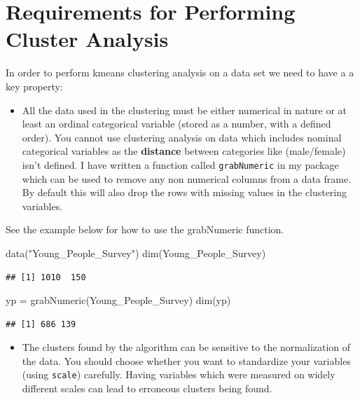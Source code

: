 \documentclass[
]{book}
\newenvironment{Shaded}{\begin{snugshade}}{\end{snugshade}}
\newcommand{\FunctionTok}[1]{\textcolor[rgb]{0.00,0.00,0.00}{#1}}
\newcommand{\NormalTok}[1]{#1}
\newcommand{\OtherTok}[1]{\textcolor[rgb]{0.56,0.35,0.01}{#1}}
\newcommand{\StringTok}[1]{\textcolor[rgb]{0.31,0.60,0.02}{#1}}
\providecommand{\tightlist}{%
  \setlength{\itemsep}{0pt}\setlength{\parskip}{0pt}}
\theoremstyle{definition}
\theoremstyle{definition}
\theoremstyle{definition}
\theoremstyle{definition}
\theoremstyle{remark}
\begin{document}
\hypertarget{requirements-for-performing-cluster-analysis}{%
\section{Requirements for Performing Cluster Analysis}\label{requirements-for-performing-cluster-analysis}}

In order to perform kmeans clustering analysis on a data set we need to have a a key property:

\begin{itemize}
\tightlist
\item
  All the data used in the clustering must be either numerical in nature or at least an ordinal categorical variable (stored as a number, with a defined order). You cannot use clustering analysis on data which includes nominal categorical variables as the \textbf{distance} between categories like (male/female) isn't defined. I have written a function called \texttt{grabNumeric} in my package which can be used to remove any non numerical columns from a data frame. By default this will also drop the rows with missing values in the clustering variables.
\end{itemize}

See the example below for how to use the grabNumeric function.

\begin{Shaded}
\begin{Highlighting}[]
\FunctionTok{data}\NormalTok{(}\StringTok{"Young\_People\_Survey"}\NormalTok{)}
\FunctionTok{dim}\NormalTok{(Young\_People\_Survey)}
\end{Highlighting}
\end{Shaded}

\begin{verbatim}
## [1] 1010  150
\end{verbatim}

\begin{Shaded}
\begin{Highlighting}[]
\NormalTok{yp }\OtherTok{=} \FunctionTok{grabNumeric}\NormalTok{(Young\_People\_Survey)}
\FunctionTok{dim}\NormalTok{(yp)}
\end{Highlighting}
\end{Shaded}

\begin{verbatim}
## [1] 686 139
\end{verbatim}

\begin{itemize}
\tightlist
\item
  The clusters found by the algorithm can be sensitive to the normalization of the data. You should choose whether you want to standardize your variables (using \texttt{scale}) carefully. Having variables which were measured on widely different scales can lead to erroneous clusters being found.
\end{itemize}
\end{document}
